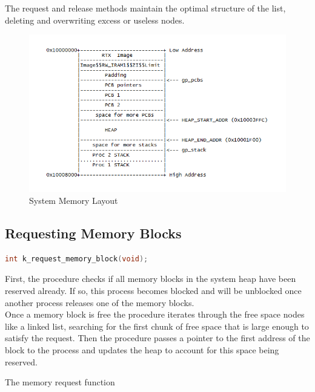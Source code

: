 \documentclass[12pt]{report}
\begin{document}
The request and release methods maintain the optimal structure of the list, deleting and overwriting excess or useless nodes.\\

\begin{figure}
	\includegraphics{memory.png}
\caption{System Memory Layout}

\end{figure}

\subsection{Requesting Memory Blocks}

\begin{minipage}{\textwidth}
\begin{lstlisting}[language=C, frame=single]
int k_request_memory_block(void);
\end{lstlisting}
\end{minipage}

First, the procedure checks if all memory blocks in the system heap have been reserved already. If so, this process becomes blocked and will be unblocked once another process releases one of the memory blocks. \\
Once a memory block is free the procedure iterates through the free space nodes like a linked list, searching for the first chunk of free space that is large enough to satisfy the request. Then the procedure passes a pointer to the first address of the block to the process and updates the heap to account for this space being reserved. \\

\begin{algorithm}
  \caption{The memory request function}
  \begin{algorithmic}[1]
	  \EndWhile
    \EndProcedure
  \end{algorithmic}
\end{algorithm}
\end{document}
